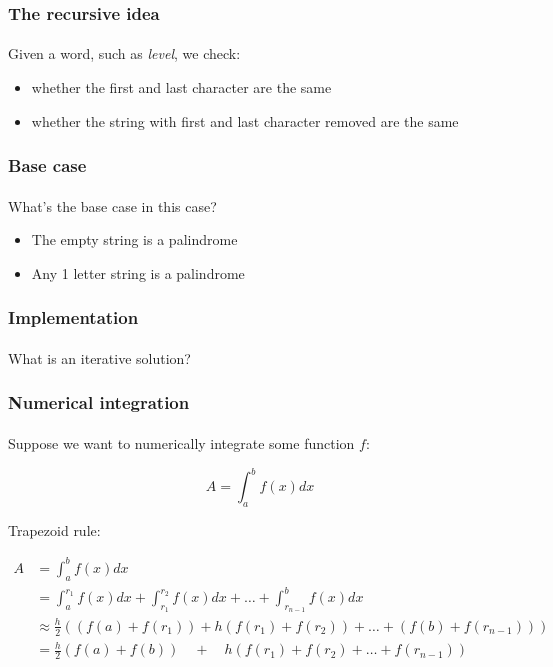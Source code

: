 \begin{frame}\frametitle{The recursive idea}
    \framesubtitle{}

    Given a word, such as \emph{level}, we check:
    \begin{itemize}
        \item whether the first and last character are the same
        \item whether the string with first and last character removed are the same
    \end{itemize}

\end{frame}

\begin{frame}\frametitle{Base case}
    \framesubtitle{}

    What's the base case in this case?

    \pause
    \begin{itemize}
        \item The empty string is a palindrome
        \item Any 1 letter string is a palindrome
    \end{itemize}

\end{frame}

\begin{frame}\frametitle{Implementation}
    \framesubtitle{}


    \pause

    What is an iterative solution?

\end{frame}

\begin{frame}\frametitle{Numerical integration}
    \framesubtitle{}

    Suppose we want to numerically integrate some function $f$:

    \[
        A = \int_a^b f(x) dx
    \]

    \pause\vfill

    Trapezoid rule:

    \begin{align*}
        A &= \int_a^b f(x) dx\\
         &= \int_a^{r_1} f(x) dx + \int_{r_1}^{r_2} f(x) dx + \ldots + \int_{r_{n-1}}^{b} f(x) dx\\
         &\approx \frac{h}{2}\left((f(a) + f(r_1)) +  h(f(r_1) + f(r_2)) + \ldots + (f(b) + f(r_{n-1}))\right)\\
         &= \frac{h}{2} (f(a) + f(b)) \quad+\quad h (f(r_1) + f(r_2) +\ldots+ f(r_{n-1}))
    \end{align*}
\end{frame}

